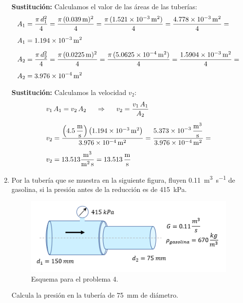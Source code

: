 \documentclass[14pt]{extarticle}
\begin{document}
\begin{enumerate}
\textbf{Sustitución: } Calculamos el valor de las áreas de las tuberías:
\begin{align*}
A_{1} &= \dfrac{\pi \, d_{1}^{2}}{4} = \dfrac{\pi \, (\SI{0.039}{\meter})^{2}}{4} = \dfrac{\pi \, (\SI{1.521d-3}{\square\meter})}{4} = \dfrac{\SI{4.778d-3}{\square\meter}}{4} = \\[0.5em]
A_{1} &= \SI{1.194d-3}{\square\meter} \\[0.5em]
A_{2} &= \dfrac{\pi \, d_{2}^{2}}{4} = \dfrac{\pi \, (\SI{0.0225}{\meter})^{2}}{4} = \dfrac{\pi \, (\SI{5.0625d-4}{\square\meter})}{4} = \dfrac{\SI{1.5904d-3}{\square\meter}}{4} = \\[0.5em]
A_{2} &= \SI{3.976d-4}{\square\meter}
\end{align*}

\textbf{Sustitución: } Calculamos la velocidad $v_{2}$:
\begin{align*}
&v_{1} \, A_{1} = v_{2} \, A_{2} \hspace*{0.5cm} \Rightarrow \hspace{0.5cm} v_{2} = \dfrac{v_{1} \, A_{1}}{A_{2}} \\[0.5em]
&v_{2} = \dfrac{\left(\displaystyle \SI[per-mode=fraction]{4.5}{\meter\per\second} \right)\left( \SI{1.194d-3}{\square\meter} \right)}{\SI{3.976d-4}{\square\meter}} = \dfrac{\displaystyle \SI[per-mode=fraction]{5.373d-3}{\cubic\meter\per\second}}{\SI{3.976d-4}{\square\meter}} = \\[0.5em]
&v_{2} = \num{13.513} \dfrac{{\unit{\cubic\meter}}}{\unit{\square\meter\second}} = \SI[per-mode=fraction]{13.513}{\meter\per\second}
\end{align*}
\item Por la tubería que se muestra en la siguiente figura, fluyen \SI{0.11}{\cubic\meter\per\second} de gasolina, si la presión antes de la reducción es de \SI{415}{\kilo\pascal}.
\begin{figure}[H]
    \centering
    \includegraphics{Imagenes/Problema_02.png}
    \caption{Esquema para el problema 4.}
\end{figure}
Calcula la presión en la tubería de \SI{75}{\milli\meter} de diámetro.


\end{enumerate}
\end{document}
